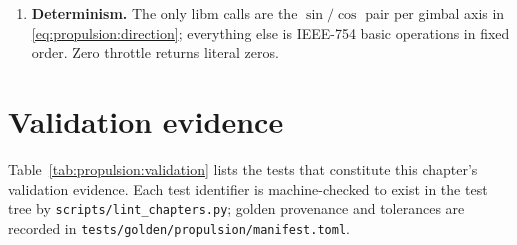 \begin{enumerate}
\begin{equation}
        \gamma_i + \operatorname{clamp}(
          \gamma_{\mathrm{cmd},i} - \gamma_i,\;
          -\dot{\gamma}_{\max} \Delta t,\;
          +\dot{\gamma}_{\max} \Delta t ),\;
        -\gamma_{\max},\; +\gamma_{\max} \bigr).
      \label{eq:propulsion:gimbalslew}
    \end{equation}
    A step command therefore produces a ramp whose per-step increment
    is exactly $\dot{\gamma}_{\max} \Delta t$ until the final partial
    step (Phase 4 exit criterion 7). The angle limit is a per-axis
    (square) clamp, not a cone.
  \item \textbf{Determinism.} The only libm calls are the
    $\sin/\cos$ pair per gimbal axis in
    \eqref{eq:propulsion:direction}; everything else is IEEE-754 basic
    operations in fixed order. Zero throttle returns literal zeros.
\end{enumerate}

\section{Validation evidence}
\label{sec:propulsion:validation}

Table~\ref{tab:propulsion:validation} lists the tests that constitute
this chapter's validation evidence. Each test identifier is
machine-checked to exist in the test tree by
\texttt{scripts/lint\_chapters.py}; golden provenance and tolerances
are recorded in \texttt{tests/golden/propulsion/manifest.toml}.

